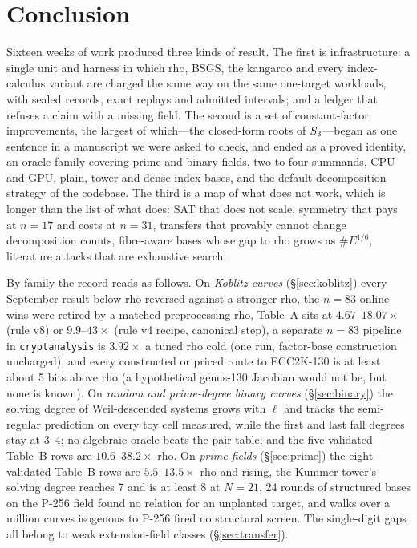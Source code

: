 \section{Conclusion}\label{sec:conclusion}

Sixteen weeks of work produced three kinds of result. The first is
infrastructure: a single unit and harness in which rho, BSGS, the kangaroo
and every index-calculus variant are charged the same way on the same
one-target workloads, with sealed records, exact replays and admitted
intervals; and a ledger that refuses a claim with a missing field. The
second is a set of constant-factor improvements, the largest of which---the
closed-form roots of $S_{3}$---began as one sentence in a manuscript we were
asked to check, and ended as a proved identity, an oracle family covering
prime and binary fields, two to four summands, CPU and GPU, plain, tower
and dense-index bases, and the default decomposition strategy of the
codebase. The third is a map of what does not work, which is longer than
the list of what does: SAT that does not scale, symmetry that pays at
$n=17$ and costs at $n=31$, transfers that provably cannot change
decomposition counts, fibre-aware bases whose gap to rho grows as
$\#E^{1/6}$, literature attacks that are exhaustive search.

By family the record reads as follows. On \emph{Koblitz curves}
(\S\ref{sec:koblitz}) every September result below rho reversed against a
stronger rho, the $n=83$ online wins were retired by a matched
preprocessing rho, Table~A sits at $4.67$--$18.07\times$ (rule v8) or
$9.9$--$43\times$ (rule v4 recipe, canonical step), a separate $n=83$
pipeline in \texttt{cryptanalysis} is $3.92\times$ a tuned rho cold (one
run, factor-base construction uncharged), and every constructed or priced
route to ECC2K-130 is at least about 5 bits above rho (a hypothetical
genus-130 Jacobian would not be, but none is known). On \emph{random and
prime-degree binary curves} (\S\ref{sec:binary}) the solving degree of
Weil-descended systems grows with $\ell$ and tracks the semi-regular
prediction on every toy cell measured, while the first and last fall
degrees stay at 3--4; no algebraic oracle beats the pair table; and the five
validated Table~B rows are $10.6$--$38.2\times$ rho. On \emph{prime fields}
(\S\ref{sec:prime}) the eight validated Table~B rows are $5.5$--$13.5\times$
rho and rising, the Kummer tower's solving degree reaches 7 and is at least
8 at $N=21$, 24 rounds of structured bases on the P-256 field found no
relation for an unplanted target, and walks over a million curves isogenous
to P-256 fired no structural screen. The single-digit gaps all belong to
weak extension-field classes (\S\ref{sec:transfer}).

